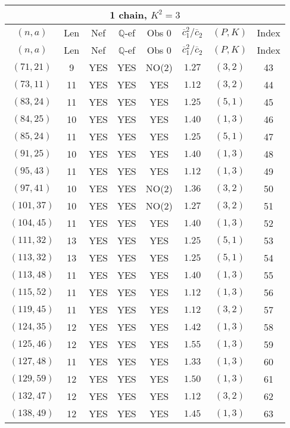 \begin{longtable}{|c|c|c|c|c|c|c|c|}
\hline
\multicolumn{8}{|c|}{1 chain, $K^2 = 3$}\\
\hline
$(n,a)$ & Len & Nef & $\mathbb Q$-ef & Obs 0 & $\overline c_1^2 / \overline c_2$ & $(P,K)$ & Index\\
\hline
\endfirsthead

\hline
$(n,a)$ & Len & Nef & $\mathbb Q$-ef & Obs 0 & $\overline c_1^2 / \overline c_2$ & $(P,K)$ & Index\\
\hline
\endhead
\hline
\endfoot

$(71,21)$ & 9 & YES & YES & NO(2) & $1.27$ & $(3,2)$ & 43\\
$(73,11)$ & 11 & YES & YES & YES & $1.12$ & $(3,2)$ & 44\\
$(83,24)$ & 11 & YES & YES & YES & $1.25$ & $(5,1)$ & 45\\
$(84,25)$ & 10 & YES & YES & YES & $1.40$ & $(1,3)$ & 46\\
$(85,24)$ & 11 & YES & YES & YES & $1.25$ & $(5,1)$ & 47\\
$(91,25)$ & 10 & YES & YES & YES & $1.40$ & $(1,3)$ & 48\\
$(95,43)$ & 11 & YES & YES & YES & $1.12$ & $(1,3)$ & 49\\
$(97,41)$ & 10 & YES & YES & NO(2) & $1.36$ & $(3,2)$ & 50\\
$(101,37)$ & 10 & YES & YES & NO(2) & $1.27$ & $(3,2)$ & 51\\
$(104,45)$ & 11 & YES & YES & YES & $1.40$ & $(1,3)$ & 52\\
$(111,32)$ & 13 & YES & YES & YES & $1.25$ & $(5,1)$ & 53\\
$(113,32)$ & 13 & YES & YES & YES & $1.25$ & $(5,1)$ & 54\\
$(113,48)$ & 11 & YES & YES & YES & $1.40$ & $(1,3)$ & 55\\
$(115,52)$ & 11 & YES & YES & YES & $1.12$ & $(1,3)$ & 56\\
$(119,45)$ & 11 & YES & YES & YES & $1.12$ & $(3,2)$ & 57\\
$(124,35)$ & 12 & YES & YES & YES & $1.42$ & $(1,3)$ & 58\\
$(125,46)$ & 12 & YES & YES & YES & $1.55$ & $(1,3)$ & 59\\
$(127,48)$ & 11 & YES & YES & YES & $1.33$ & $(1,3)$ & 60\\
$(129,59)$ & 12 & YES & YES & YES & $1.50$ & $(1,3)$ & 61\\
$(132,47)$ & 12 & YES & YES & YES & $1.12$ & $(3,2)$ & 62\\
$(138,49)$ & 12 & YES & YES & YES & $1.45$ & $(1,3)$ & 63\\

\end{longtable}
